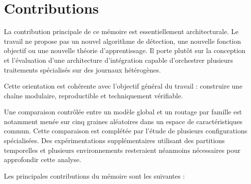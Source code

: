 \section{Contributions}

La contribution principale de ce mémoire est essentiellement architecturale. Le travail ne propose pas un nouvel algorithme de détection, une nouvelle fonction objectif ou une nouvelle théorie d'apprentissage. Il porte plutôt sur la conception et l'évaluation d'une architecture d'intégration capable d'orchestrer plusieurs traitements spécialisés sur des journaux hétérogènes.

Cette orientation est cohérente avec l'objectif général du travail : construire une chaîne modulaire, reproductible et techniquement vérifiable.

Une comparaison contrôlée entre un modèle global et un routage par famille est notamment menée sur cinq graines aléatoires dans un espace de caractéristiques commun. Cette comparaison est complétée par l'étude de plusieurs configurations spécialisées. Des expérimentations supplémentaires utilisant des partitions temporelles et plusieurs environnements resteraient néanmoins nécessaires pour approfondir cette analyse.

Les principales contributions du mémoire sont les suivantes :

